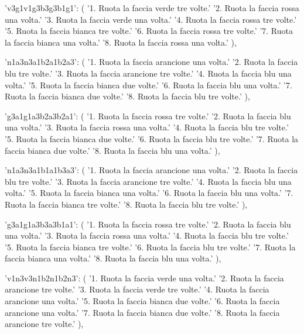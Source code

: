 {{        'v3g1v1g3b3g3b1g1': (
            '1. Ruota la faccia verde tre volte.\n'
            '2. Ruota la faccia rossa una volta.\n'
            '3. Ruota la faccia verde una volta.\n'
            '4. Ruota la faccia rossa tre volte.\n'
            '5. Ruota la faccia bianca tre volte.\n'
            '6. Ruota la faccia rossa tre volte.\n'
            '7. Ruota la faccia bianca una volta.\n'
            '8. Ruota la faccia rossa una volta.'
        ),

        'n1a3n3a1b2a1b2a3': (
            '1. Ruota la faccia arancione una volta.\n'
            '2. Ruota la faccia blu tre volte.\n'
            '3. Ruota la faccia arancione tre volte.\n'
            '4. Ruota la faccia blu una volta.\n'
            '5. Ruota la faccia bianca due volte.\n'
            '6. Ruota la faccia blu una volta.\n'
            '7. Ruota la faccia bianca due volte.\n'
            '8. Ruota la faccia blu tre volte.'
        ),

        'g3a1g1a3b2a3b2a1': (
            '1. Ruota la faccia rossa tre volte.\n'
            '2. Ruota la faccia blu una volta.\n'
            '3. Ruota la faccia rossa una volta.\n'
            '4. Ruota la faccia blu tre volte.\n'
            '5. Ruota la faccia bianca due volte.\n'
            '6. Ruota la faccia blu tre volte.\n'
            '7. Ruota la faccia bianca due volte.\n'
            '8. Ruota la faccia blu una volta.'
        ),

        'n1a3n3a1b1a1b3a3': (
            '1. Ruota la faccia arancione una volta.\n'
            '2. Ruota la faccia blu tre volte.\n'
            '3. Ruota la faccia arancione tre volte.\n'
            '4. Ruota la faccia blu una volta.\n'
            '5. Ruota la faccia bianca una volta.\n'
            '6. Ruota la faccia blu una volta.\n'
            '7. Ruota la faccia bianca tre volte.\n'
            '8. Ruota la faccia blu tre volte.'
        ),

        'g3a1g1a3b3a3b1a1': (
            '1. Ruota la faccia rossa tre volte.\n'
            '2. Ruota la faccia blu una volta.\n'
            '3. Ruota la faccia rossa una volta.\n'
            '4. Ruota la faccia blu tre volte.\n'
            '5. Ruota la faccia bianca tre volte.\n'
            '6. Ruota la faccia blu tre volte.\n'
            '7. Ruota la faccia bianca una volta.\n'
            '8. Ruota la faccia blu una volta.'
        ),

        'v1n3v3n1b2n1b2n3': (
            '1. Ruota la faccia verde una volta.\n'
            '2. Ruota la faccia arancione tre volte.\n'
            '3. Ruota la faccia verde tre volte.\n'
            '4. Ruota la faccia arancione una volta.\n'
            '5. Ruota la faccia bianca due volte.\n'
            '6. Ruota la faccia arancione una volta.\n'
            '7. Ruota la faccia bianca due volte.\n'
            '8. Ruota la faccia arancione tre volte.'
        ),

}}
